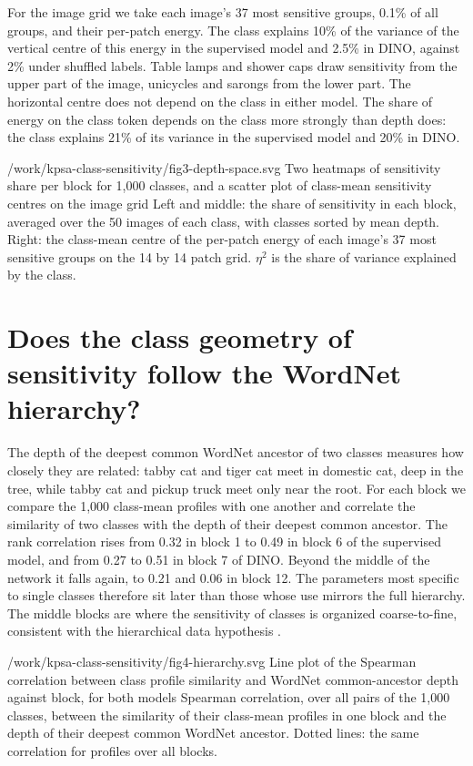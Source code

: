 \documentclass[11pt]{article}
\begin{document}
For the image grid we take each image's 37 most sensitive groups, 0.1\% of all groups, and their per-patch energy. The class explains 10\% of the variance of the vertical centre of this energy in the supervised model and 2.5\% in DINO, against 2\% under shuffled labels. Table lamps and shower caps draw sensitivity from the upper part of the image, unicycles and sarongs from the lower part. The horizontal centre does not depend on the class in either model. The share of energy on the class token depends on the class more strongly than depth does: the class explains 21\% of its variance in the supervised model and 20\% in DINO.

  {/work/kpsa-class-sensitivity/fig3-depth-space.svg}
  {Two heatmaps of sensitivity share per block for 1,000 classes, and a scatter plot of class-mean sensitivity centres on the image grid}
  {Left and middle: the share of sensitivity in each block, averaged over the 50 images of each class, with classes sorted by mean depth. Right: the class-mean centre of the per-patch energy of each image's 37 most sensitive groups on the 14 by 14 patch grid. $\eta^2$ is the share of variance explained by the class.}

\section{Does the class geometry of sensitivity follow the WordNet hierarchy?}\label{hierarchy}

The depth of the deepest common WordNet ancestor of two classes measures how closely they are related: tabby cat and tiger cat meet in domestic cat, deep in the tree, while tabby cat and pickup truck meet only near the root. For each block we compare the 1,000 class-mean profiles with one another and correlate the similarity of two classes with the depth of their deepest common ancestor. The rank correlation rises from 0.32 in block 1 to 0.49 in block 6 of the supervised model, and from 0.27 to 0.51 in block 7 of DINO. Beyond the middle of the network it falls again, to 0.21 and 0.06 in block 12. The parameters most specific to single classes therefore sit later than those whose use mirrors the full hierarchy. The middle blocks are where the sensitivity of classes is organized coarse-to-fine, consistent with the hierarchical data hypothesis \cite{hdh}.

  {/work/kpsa-class-sensitivity/fig4-hierarchy.svg}
  {Line plot of the Spearman correlation between class profile similarity and WordNet common-ancestor depth against block, for both models}
  {Spearman correlation, over all pairs of the 1,000 classes, between the similarity of their class-mean profiles in one block and the depth of their deepest common WordNet ancestor. Dotted lines: the same correlation for profiles over all blocks.}
\end{document}
